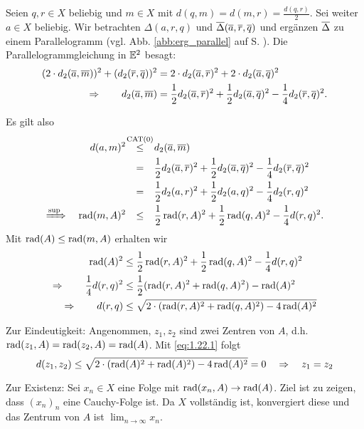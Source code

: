 \begin{beweis}
	Seien $q,r \in X$ beliebig und $m \in X$ mit $d(q,m) = d(m,r) = \frac{d(q,r)}{2}$.
	Sei weiter $a \in X$ beliebig. Wir betrachten $\Delta(a,r,q)$ und $\overline{\Delta}(\overline{a},\overline{r},\overline{q})$ und ergänzen $\overline{\Delta}$ zu einem Parallelogramm (vgl. Abb. \ref{abb:erg_parallel} auf S. \pageref{abb:erg_parallel}). Die Parallelogrammgleichung in $\mathbb{E}^2$ besagt:
	\begin{align*}
		(2 \cdot d_2(\overline{a},\overline{m}))^2 + (d_2(\overline{r},\overline{q}))^2 &= 2 \cdot d_2(\overline{a},\overline{r})^2 + 2 \cdot d_2 (\overline{a},\overline{q})^2 \\
		\Rightarrow \qquad d_2(\overline{a},\overline{m}) &= \frac{1}{2} d_2(\overline{a},\overline{r})^2 + \frac{1}{2} d_2(\overline{a},\overline{q})^2 - \frac{1}{4} d_2 (\overline{r},\overline{q})^2.
	\end{align*}

	Es gilt also
	\begin{align*}
		d(a,m)^2 &\stack{\CAT}{\leq} d_2(\ol{a},\ol{m}) \\
		&\stack{}{=} \frac{1}{2} d_2(\ol{a},\ol{r})^2 + \frac{1}{2} d_2(\ol{a},\ol{q})^2 - \frac{1}{4} d_2 (\ol{r},\ol{q})^2 \\
		&\stack{}{=} \frac{1}{2} d_2(a,r)^2 + \frac{1}{2} d_2(a,q)^2 - \frac{1}{4} d_2 (r,q)^2 \\
		\xRightarrow{\sup} \quad \rad(m,A)^2 &\stack{}{\leq} \frac{1}{2} \rad(r,A)^2 + \frac{1}{2} \rad(q,A)^2 - \frac{1}{4} d(r,q)^2.
	\end{align*}
	Mit $\operatorname{rad}(A) \leq \operatorname{rad}(m,A)$ erhalten wir
	\begin{align}
		\operatorname{rad}(A)^2 &\leq \frac{1}{2} \operatorname{rad}(r,A)^2 + \frac{1}{2} \operatorname{rad}(q,A)^2 - \frac{1}{4} d(r,q)^2 \\
		\Rightarrow \qquad \frac{1}{4} d(r,q)^2 &\leq \frac{1}{2} (\operatorname{rad}(r,A)^2 + \operatorname{rad}(q,A)^2) - \operatorname{rad}(A)^2 \\
		\Rightarrow \qquad d(r,q) &\leq \sqrt{2 \cdot (\operatorname{rad}(r,A)^2 + \operatorname{rad}(q,A)^2) - 4 \operatorname{rad}(A)^2} \label{eq:1.22.1}
	\end{align}
	
	Zur Eindeutigkeit: Angenommen, $z_1,z_2$ sind zwei Zentren von $A$, d.h. $\operatorname{rad}(z_1,A) = \operatorname{rad}(z_2,A) = \operatorname{rad}(A)$. Mit \eqref{eq:1.22.1} folgt
	\[
		d(z_1,z_2) \leq \sqrt{2 \cdot (\operatorname{rad}(A)^2 + \operatorname{rad}(A)^2) - 4\operatorname{rad}(A)^2} = 0 \quad \Rightarrow \quad z_1 = z_2
	\]
	
	Zur Existenz: Sei $x_n \in X$ eine Folge mit $\operatorname{rad}(x_n,A) \rightarrow \operatorname{rad}(A)$. Ziel ist zu zeigen, dass $(x_n)_n$ eine Cauchy-Folge ist.
	Da $X$ vollständig ist, konvergiert diese und das Zentrum von $A$ ist $\lim_{n\rightarrow \infty} x_n$.
	

\end{beweis}

